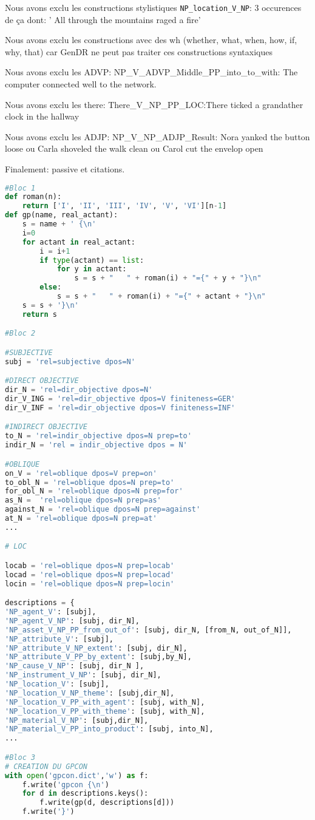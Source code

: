 Nous avons exclu les constructions stylistiques
\lstinline!NP_location_V_NP!: 3 occurences de ça dont: ' All through the mountains raged a fire'

Nous avons exclu les constructions avec des wh (whether, what, when, how, if, why, that) car GenDR ne peut pas traiter ces constructions syntaxiques

Nous avons exclu les ADVP: NP\_V\_ADVP\_Middle\_PP\_into\_to\_with: The computer connected well to the network.

Nous avons exclu les there: There\_V\_NP\_PP\_LOC:There ticked a grandather clock in the hallway

Nous avons exclu les ADJP: NP\_V\_NP\_ADJP\_Result: Nora yanked the button loose ou Carla shoveled the walk clean ou Carol cut the envelop open

Finalement: passive et citations.

\begin{lstlisting}[language=Python, caption = code pour gpcon.dict]
#Bloc 1
def roman(n):
    return ['I', 'II', 'III', 'IV', 'V', 'VI'][n-1]
def gp(name, real_actant):
    s = name + ' {\n'
    i=0
    for actant in real_actant:
        i = i+1
        if type(actant) == list:
            for y in actant:
                s = s + "   " + roman(i) + "={" + y + "}\n"
        else:
            s = s + "   " + roman(i) + "={" + actant + "}\n"
    s = s + '}\n'
    return s

#Bloc 2

#SUBJECTIVE
subj = 'rel=subjective dpos=N'

#DIRECT OBJECTIVE
dir_N = 'rel=dir_objective dpos=N'
dir_V_ING = 'rel=dir_objective dpos=V finiteness=GER'
dir_V_INF = 'rel=dir_objective dpos=V finiteness=INF'

#INDIRECT OBJECTIVE
to_N = 'rel=indir_objective dpos=N prep=to'
indir_N = 'rel = indir_objective dpos = N'

#OBLIQUE
on_V = 'rel=oblique dpos=V prep=on'
to_obl_N = 'rel=oblique dpos=N prep=to' 
for_obl_N = 'rel=oblique dpos=N prep=for'
as_N =  'rel=oblique dpos=N prep=as'
against_N = 'rel=oblique dpos=N prep=against'
at_N = 'rel=oblique dpos=N prep=at'
...

# LOC

locab = 'rel=oblique dpos=N prep=locab'
locad = 'rel=oblique dpos=N prep=locad'
locin = 'rel=oblique dpos=N prep=locin'

descriptions = {
'NP_agent_V': [subj],
'NP_agent_V_NP': [subj, dir_N],
'NP_asset_V_NP_PP_from_out_of': [subj, dir_N, [from_N, out_of_N]],
'NP_attribute_V': [subj],
'NP_attribute_V_NP_extent': [subj, dir_N],
'NP_attribute_V_PP_by_extent': [subj,by_N],
'NP_cause_V_NP': [subj, dir_N ],
'NP_instrument_V_NP': [subj, dir_N],
'NP_location_V': [subj],
'NP_location_V_NP_theme': [subj,dir_N],
'NP_location_V_PP_with_agent': [subj, with_N],
'NP_location_V_PP_with_theme': [subj, with_N],
'NP_material_V_NP': [subj,dir_N],
'NP_material_V_PP_into_product': [subj, into_N],
...

#Bloc 3
# CREATION DU GPCON
with open('gpcon.dict','w') as f:
    f.write('gpcon {\n')
    for d in descriptions.keys():
        f.write(gp(d, descriptions[d]))
    f.write('}')

\end{lstlisting}

